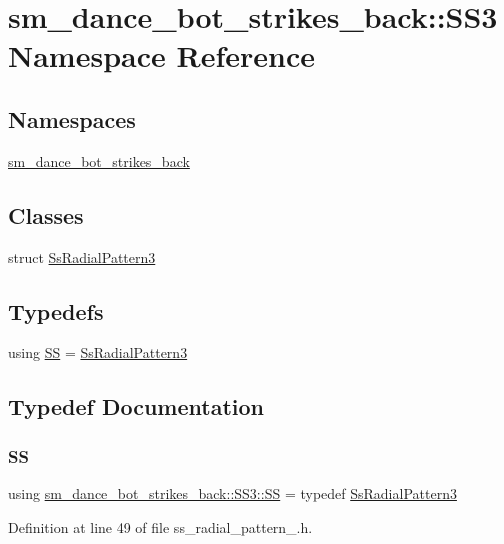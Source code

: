 \hypertarget{namespacesm__dance__bot__strikes__back_1_1SS3}{}\section{sm\+\_\+dance\+\_\+bot\+\_\+strikes\+\_\+back\+:\+:S\+S3 Namespace Reference}
\label{namespacesm__dance__bot__strikes__back_1_1SS3}
\subsection*{Namespaces}
\begin{DoxyCompactItemize}
\item 
 \hyperlink{namespacesm__dance__bot__strikes__back_1_1SS3_1_1sm__dance__bot__strikes__back}{sm\+\_\+dance\+\_\+bot\+\_\+strikes\+\_\+back}
\end{DoxyCompactItemize}
\subsection*{Classes}
\begin{DoxyCompactItemize}
\item 
struct \hyperlink{structsm__dance__bot__strikes__back_1_1SS3_1_1SsRadialPattern3}{Ss\+Radial\+Pattern3}
\end{DoxyCompactItemize}
\subsection*{Typedefs}
\begin{DoxyCompactItemize}
\item 
using \hyperlink{namespacesm__dance__bot__strikes__back_1_1SS3_a4b66297a124923697d0aff0b55de3abc}{SS} = \hyperlink{structsm__dance__bot__strikes__back_1_1SS3_1_1SsRadialPattern3}{Ss\+Radial\+Pattern3}
\end{DoxyCompactItemize}


\subsection{Typedef Documentation}
\mbox{\label{namespacesm__dance__bot__strikes__back_1_1SS3_a4b66297a124923697d0aff0b55de3abc}} 
\subsubsection{\texorpdfstring{SS}{SS}}
{\footnotesize\ttfamily using \hyperlink{namespacesm__dance__bot__strikes__back_1_1SS3_a4b66297a124923697d0aff0b55de3abc}{sm\+\_\+dance\+\_\+bot\+\_\+strikes\+\_\+back\+::\+S\+S3\+::\+SS} = typedef \hyperlink{structsm__dance__bot__strikes__back_1_1SS3_1_1SsRadialPattern3}{Ss\+Radial\+Pattern3}}



Definition at line 49 of file ss\+\_\+radial\+\_\+pattern\+\_.\+h.


